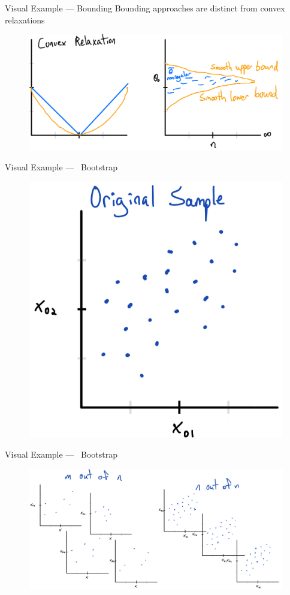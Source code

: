 \documentclass[aspectratio=169, professionalfonts, handout]{beamer}
\begin{document}
\begin{frame}{Visual Example --- Bounding}
	Bounding approaches are distinct from convex relaxations
	\begin{figure}
		\includegraphics[width=\textwidth]{figures/sketch-bounding}
	\end{figure}

\end{frame}
\begin{frame}{Visual Example --- \mon \, Bootstrap}
	\begin{figure}
		\includegraphics[width=.55\textwidth]{figures/sketch-bootstrap1}
	\end{figure}

\end{frame}
\begin{frame}{Visual Example --- \mon \, Bootstrap}
	\begin{figure}
		\includegraphics[width=\textwidth]{figures/sketch-bootstrap2}
	\end{figure}

\end{frame}
\end{document}
